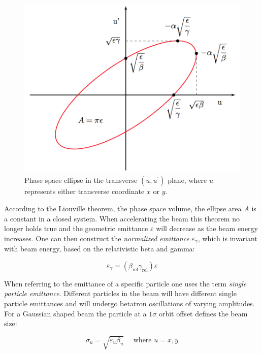 \begin{figure}[!htb]
    \begin{center}
    \includegraphics[width = 0.85\linewidth]{Figures/Chapter2/Phase_Space.png}
    \caption{Phase space ellipse in the transverse \((u, u^{\prime})\) plane, where \(u\) represents either transverse coordinate \(x\) or \(y\).}
    \label{figure:phase_space_ellipse}
    \end{center}
\end{figure}

According to the Liouville theorem, the phase space volume, the ellipse area \(A\) is a constant in a closed system.
When accelerating the beam this theorem no longer holds true and the geometric emittance \(\varepsilon\) will decrease as the beam energy increases.
One can then construct the \emph{normalized emittance} \(\varepsilon_{\gamma}\), which is invariant with beam energy, based on the relativistic beta and gamma:

\begin{equation}
    \varepsilon_{\gamma} = (\beta_{\mathrm{rel}} \gamma_{\mathrm{rel}}) \varepsilon
    \label{equation:normalized_emittance}
\end{equation}

When referring to the emittance of a specific particle one uses the term \emph{single particle emittance}.
Different particles in the beam will have different single particle emittances and will undergo betatron oscillations of varying amplitudes.
For a Gaussian shaped beam the particle at a \(1 \sigma\) orbit offset defines the beam size:

\begin{equation}
    \sigma_u = \sqrt{\varepsilon_u \beta_u} \quad \text { where } u = x, y
\end{equation}

